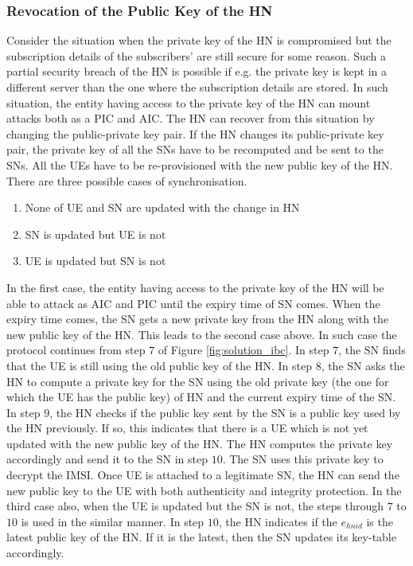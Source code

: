 \documentclass[12pt]{llncs}
\begin{document}
\subsubsection{Revocation of the Public Key of the HN}
Consider the situation when the private key of the HN is compromised but the subscription details of the subscribers' are still secure for some reason. Such a partial security breach of the HN is possible if e.g. the private key is kept in a different server than the one where the subscription details are stored. In such situation, the entity having access to the private key of the HN can mount attacks both as a PIC and AIC. The HN can recover from this situation by changing the public-private key pair. If the HN changes its public-private key pair, the private key of all the SNs have to be recomputed and be sent to the SNs. All the UEs have to be re-provisioned with the new public key of the HN. There are three possible cases of synchronisation.
\begin{enumerate}
\item None of UE and SN are updated with the change in HN
\item SN is updated but UE is not
\item UE is updated but SN is not
\end{enumerate} 

In the first case, the entity having access to the private key of the HN will be able to attack as AIC and PIC until the expiry time of SN comes. When the expiry time comes, the SN gets a new private key from the HN along with the new public key of the HN. This leads to the second case above. In such case the protocol continues from step $7$ of Figure \ref{fig:solution_ibc}. In step $7$, the SN finds that the UE is still using the old public key of the HN. In step $8$, the SN asks the HN to compute a private key for the SN using the old private key (the one for which the UE has the public key) of HN and the current expiry time of the SN. In step $9$, the HN checks if the public key sent by the SN is a public key used by the HN previously. If so, this indicates that there is a UE which is not yet updated with the new public key of the HN. The HN computes the private key accordingly and send it to the SN in step $10$. The SN uses this private key to decrypt the IMSI. Once UE is attached to a legitimate SN, the HN can send the new public key to the UE with both authenticity and integrity protection. In the third case also, when the UE is updated but the SN is not, the steps through $7$ to $10$ is used in the similar manner. In step $10$, the HN indicates if the $e_{hnid}$ is the latest public key of the HN. If it is the latest, then the SN updates its key-table accordingly.
\end{document}
